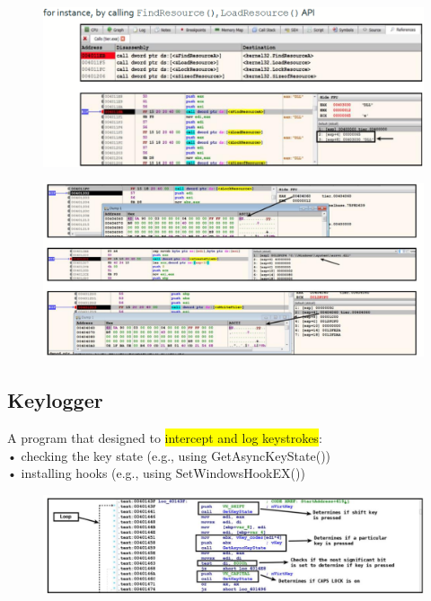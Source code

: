 \documentclass[]{project_plan}
\begin{document}
\begin{figure}[H]
  \centering
  \includegraphics[width=\linewidth]{dropper.png}
\end{figure}
\begin{figure}[H]
  \centering
  \includegraphics[width=\linewidth]{dropper 2.png}
\end{figure}

\subsection{Keylogger}
A program that designed to \colorbox{yellow}{intercept and log keystrokes}:\\
• checking the key state (e.g., using GetAsyncKeyState())\\
• installing hooks (e.g., using SetWindowsHookEX())

\begin{figure}[H]
  \centering
  \includegraphics[width=\linewidth]{keylogger.png}
\end{figure}
\end{document}
